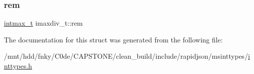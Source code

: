 \mbox{\label{structimaxdiv__t_a6c9701ad10bff81edae7ff679cae7850}} 
\subsubsection{\texorpdfstring{rem}{rem}}
{\footnotesize\ttfamily \hyperlink{stdint_8h_a036cd61bb4b30bb510b9538af4cebd1d}{intmax\+\_\+t} imaxdiv\+\_\+t\+::rem}



The documentation for this struct was generated from the following file\+:\begin{DoxyCompactItemize}
\item 
/mnt/hdd/fnky/\+C0de/\+C\+A\+P\+S\+T\+O\+N\+E/clean\+\_\+build/include/rapidjson/msinttypes/\hyperlink{inttypes_8h}{inttypes.\+h}\end{DoxyCompactItemize}

